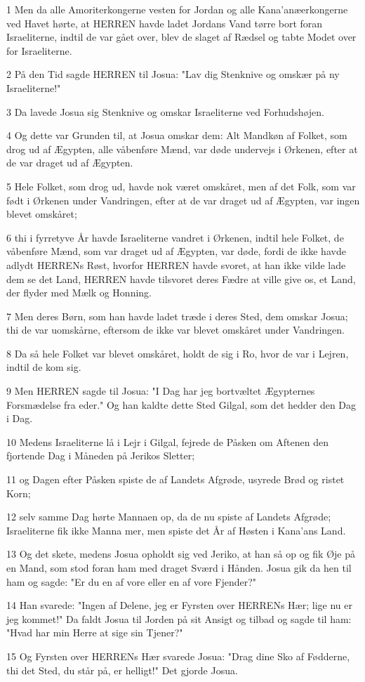 \par 1 Men da alle Amoriterkongerne vesten for Jordan og alle Kana'anæerkongerne ved Havet hørte, at HERREN havde ladet Jordans Vand tørre bort foran Israeliterne, indtil de var gået over, blev de slaget af Rædsel og tabte Modet over for Israeliterne.
\par 2 På den Tid sagde HERREN til Josua: "Lav dig Stenknive og omskær på ny Israeliterne!"
\par 3 Da lavede Josua sig Stenknive og omskar Israeliterne ved Forhudshøjen.
\par 4 Og dette var Grunden til, at Josua omskar dem: Alt Mandkøn af Folket, som drog ud af Ægypten, alle våbenføre Mænd, var døde undervejs i Ørkenen, efter at de var draget ud af Ægypten.
\par 5 Hele Folket, som drog ud, havde nok været omskåret, men af det Folk, som var født i Ørkenen under Vandringen, efter at de var draget ud af Ægypten, var ingen blevet omskåret;
\par 6 thi i fyrretyve År havde Israeliterne vandret i Ørkenen, indtil hele Folket, de våbenføre Mænd, som var draget ud af Ægypten, var døde, fordi de ikke havde adlydt HERRENs Røst, hvorfor HERREN havde svoret, at han ikke vilde lade dem se det Land, HERREN havde tilsvoret deres Fædre at ville give os, et Land, der flyder med Mælk og Honning.
\par 7 Men deres Børn, som han havde ladet træde i deres Sted, dem omskar Josua; thi de var uomskårne, eftersom de ikke var blevet omskåret under Vandringen.
\par 8 Da så hele Folket var blevet omskåret, holdt de sig i Ro, hvor de var i Lejren, indtil de kom sig.
\par 9 Men HERREN sagde til Josua: "I Dag har jeg bortvæltet Ægypternes Forsmædelse fra eder." Og han kaldte dette Sted Gilgal, som det hedder den Dag i Dag.
\par 10 Medens Israeliterne lå i Lejr i Gilgal, fejrede de Påsken om Aftenen den fjortende Dag i Måneden på Jerikos Sletter;
\par 11 og Dagen efter Påsken spiste de af Landets Afgrøde, usyrede Brød og ristet Korn;
\par 12 selv samme Dag hørte Mannaen op, da de nu spiste af Landets Afgrøde; Israeliterne fik ikke Manna mer, men spiste det År af Høsten i Kana'ans Land.
\par 13 Og det skete, medens Josua opholdt sig ved Jeriko, at han så op og fik Øje på en Mand, som stod foran ham med draget Sværd i Hånden. Josua gik da hen til ham og sagde: "Er du en af vore eller en af vore Fjender?"
\par 14 Han svarede: "Ingen af Delene, jeg er Fyrsten over HERRENs Hær; lige nu er jeg kommet!" Da faldt Josua til Jorden på sit Ansigt og tilbad og sagde til ham: "Hvad har min Herre at sige sin Tjener?"
\par 15 Og Fyrsten over HERRENs Hær svarede Josua: "Drag dine Sko af Fødderne, thi det Sted, du står på, er helligt!" Det gjorde Josua.

